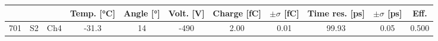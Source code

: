 \begin{tabular}{ccccccccccc}
\toprule
 &  &  & Temp. [°C] & Angle [°] & Volt. [V] & Charge [fC] & \(\pm\sigma\) [fC] & Time res. [ps] & \(\pm\sigma\) [ps] & Eff. \\
\midrule
701 & S2 & Ch4 & -31.3 & 14 & -490 & 2.00 & 0.01 & 99.93 & 0.05 & 0.500 \\
\bottomrule
\end{tabular}
